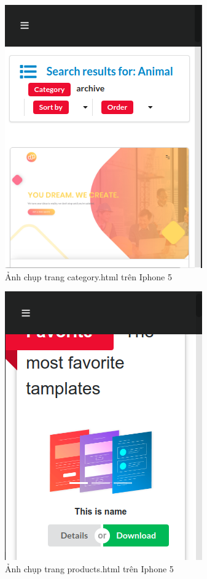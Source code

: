 \documentclass[a4paper]{article}
\begin{document}
\begin{figure}[H]
\begin{center}
\includegraphics[page=1, scale=0.5]{screenshot/iphone3.png}
\caption{Ảnh chụp trang category.html trên Iphone 5}
\end{center}
\end{figure}

\begin{figure}[H]
\begin{center}
\includegraphics[page=1, scale=0.5]{screenshot/iphone4.png}
\caption{Ảnh chụp trang products.html trên Iphone 5}
\end{center}
\end{figure}
\end{document}
